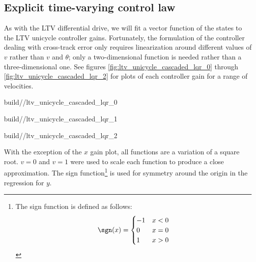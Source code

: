 \subsection{Explicit time-varying control law}

As with the LTV differential drive, we will fit a vector function of the states
to the LTV unicycle controller gains. Fortunately, the formulation of the
controller dealing with cross-track error only requires linearization around
different values of $v$ rather than $v$ and $\theta$; only a two-dimensional
function is needed rather than a three-dimensional one. See figures
\ref{fig:ltv_unicycle_cascaded_lqr_0} through
\ref{fig:ltv_unicycle_cascaded_lqr_2} for plots of each controller gain for a
range of velocities.

\begin{bookfigure}
  \begin{minisvg}{2}{build/\chapterpath/ltv_unicycle_cascaded_lqr_0}
    \caption{Linear time-varying unicycle controller cascaded LQR gain
      regression ($x$)}
    \label{fig:ltv_unicycle_cascaded_lqr_0}
  \end{minisvg}
  \hfill
  \begin{minisvg}{2}{build/\chapterpath/ltv_unicycle_cascaded_lqr_1}
    \caption{Linear time-varying unicycle controller cascaded LQR gain
      regression ($y$)}
  \end{minisvg}
  \hfill
  \begin{minisvg}{2}{build/\chapterpath/ltv_unicycle_cascaded_lqr_2}
    \caption{Linear time-varying unicycle controller cascaded LQR gain
      regression ($\theta$)}
    \label{fig:ltv_unicycle_cascaded_lqr_2}
  \end{minisvg}
\end{bookfigure}

With the exception of the $x$ gain plot, all functions are a variation of a
square root. $v = 0$ and $v = 1$ were used to scale each function to produce a
close approximation. The sign function\footnote{The sign function is defined as
follows:
\begin{equation*}
  \sgn(x) = \begin{cases}
    -1 & x < 0 \\
    0 & x = 0 \\
    1 & x > 0
  \end{cases}
\end{equation*}} is used for symmetry around the origin in the regression for
$y$.

